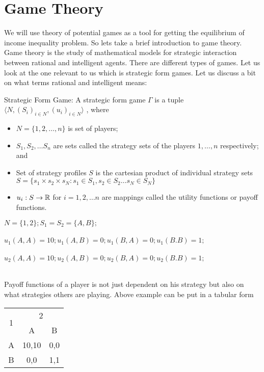 \documentclass[letterpaper,english,12pt]{article}
\begin{document}
\section{Game Theory}
We will use theory of potential games as a tool for getting the equilibrium of income inequality problem. So lets take a brief introduction to game theory. \\
Game theory is the study of mathematical models for strategic interaction between rational and intelligent agents. There are different types of games. Let us look at the one relevant to us which is strategic form games. Let us discuss a bit on what terms rational and intelligent means:

\begin{defn}
Strategic Form Game: A strategic form game $\Gamma$ is a tuple $\langle N, (S_i)_{i\in N}, (u_i)_{i \in N} \rangle$ , where 
\begin{itemize}
\item $N = \lbrace 1,2,\dots ,n\rbrace$ is set of players;
\item $S_1,S_2,\dots S_n$ are sets called the strategy sets of the players $1,\dots , n$ respectively; and
\item Set of strategy profiles $S$ is the cartesian product of individual strategy sets $S=\lbrace s_1 \times s_2 \times s_N : s_1\in S_1, s_2 \in S_2 \dots s_N \in S_N  \rbrace $
\item $u_i  : S \rightarrow \mathbb{R}$ for $i=1,2,\dots n$ are mappings called the utility functions or payoff functions.

\end{itemize}
 \end{defn}
\begin{exmp}
$ N=\lbrace 1,2 \rbrace ;S_1= S_2 = \lbrace A,B \rbrace ;$ \\ \\
$u_1(A,A) = 10; u_1(A,B)=0; u_1(B,A) = 0 ; u_1(B.B) = 1;$ \\ \\
$u_2(A,A) = 10; u_2(A,B)=0; u_2(B,A) = 0 ; u_2(B.B) = 1;$ \\ \\
\end{exmp}
Payoff functions of a player is not just dependent on his strategy but also on what strategies others are playing.
Above example can be put in a tabular form

\begin{table}[ht]
\begin{center}
\begin{tabular}{|c|c|c|}
\hline
\multirow{2}{*}{1} & \multicolumn{2}{c|}{2} \\ \cline{2-3} 
                   & A           & B        \\ \hline
A                  & 10,10       & 0,0      \\ \hline
B                  & 0,0         & 1,1      \\ \hline
\end{tabular}
\end{center}
\end{table}
\end{document}
